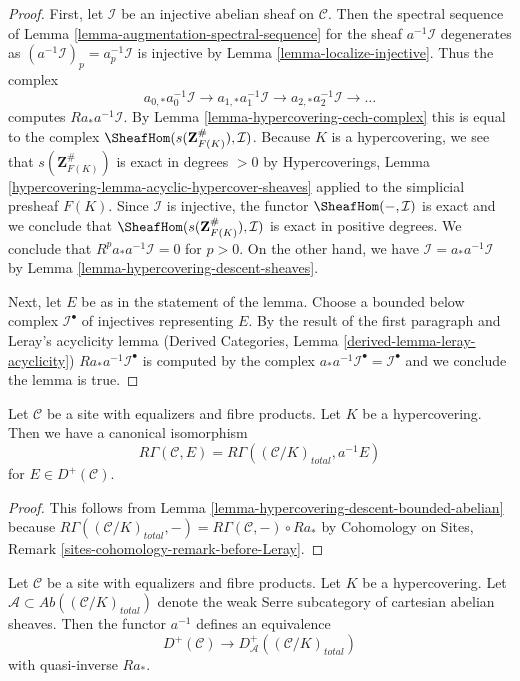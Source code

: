 \begin{proof}
First, let $\mathcal{I}$ be an injective abelian sheaf on $\mathcal{C}$.
Then the spectral sequence of
Lemma \ref{lemma-augmentation-spectral-sequence}
for the sheaf $a^{-1}\mathcal{I}$ degenerates as
$(a^{-1}\mathcal{I})_p = a_p^{-1}\mathcal{I}$
is injective by Lemma \ref{lemma-localize-injective}.
Thus the complex
$$
a_{0, *}a_0^{-1}\mathcal{I} \to
a_{1, *}a_1^{-1}\mathcal{I} \to
a_{2, *}a_2^{-1}\mathcal{I} \to\ldots
$$
computes $Ra_*a^{-1}\mathcal{I}$. By
Lemma \ref{lemma-hypercovering-cech-complex}
this is equal to the complex
$\SheafHom(s(\mathbf{Z}_{F(K)}^\#), \mathcal{I})$.
Because $K$ is a hypercovering, we see that
$s(\mathbf{Z}_{F(K)}^\#)$ is exact in degrees $> 0$ by
Hypercoverings, Lemma \ref{hypercovering-lemma-acyclic-hypercover-sheaves}
applied to the simplicial presheaf $F(K)$.
Since $\mathcal{I}$ is injective, the functor $\SheafHom(-, \mathcal{I})$
is exact and we conclude that
$\SheafHom(s(\mathbf{Z}_{F(K)}^\#), \mathcal{I})$
is exact in positive degrees. We conclude that
$R^pa_*a^{-1}\mathcal{I} = 0$ for $p > 0$.
On the other hand, we have $\mathcal{I} = a_*a^{-1}\mathcal{I}$
by Lemma \ref{lemma-hypercovering-descent-sheaves}.

\medskip\noindent
Next, let $E$ be as in the statement of the lemma.
Choose a bounded below complex $\mathcal{I}^\bullet$ of injectives
representing $E$. By the result of the first paragraph and
Leray's acyclicity lemma
(Derived Categories, Lemma \ref{derived-lemma-leray-acyclicity})
$Ra_*a^{-1}\mathcal{I}^\bullet$
is computed by the complex
$a_*a^{-1}\mathcal{I}^\bullet = \mathcal{I}^\bullet$
and we conclude the lemma is true.
\end{proof}

\begin{lemma}
\label{lemma-compare-cohomology-hypercovering}
Let $\mathcal{C}$ be a site with equalizers and fibre products.
Let $K$ be a hypercovering.
Then we have a canonical isomorphism
$$
R\Gamma(\mathcal{C}, E) =
R\Gamma((\mathcal{C}/K)_{total}, a^{-1}E)
$$
for $E \in D^+(\mathcal{C})$.
\end{lemma}

\begin{proof}
This follows from Lemma \ref{lemma-hypercovering-descent-bounded-abelian}
because $R\Gamma((\mathcal{C}/K)_{total}, -) =
R\Gamma(\mathcal{C}, -) \circ Ra_*$ by
Cohomology on Sites, Remark \ref{sites-cohomology-remark-before-Leray}.
\end{proof}

\begin{lemma}
\label{lemma-hypercovering-equivalence-bounded}
Let $\mathcal{C}$ be a site with equalizers and fibre products.
Let $K$ be a hypercovering.
Let $\mathcal{A} \subset \textit{Ab}((\mathcal{C}/K)_{total})$
denote the weak Serre subcategory of cartesian abelian sheaves.
Then the functor $a^{-1}$ defines an equivalence
$$
D^+(\mathcal{C}) \longrightarrow D_\mathcal{A}^+((\mathcal{C}/K)_{total})
$$
with quasi-inverse $Ra_*$.
\end{lemma}


